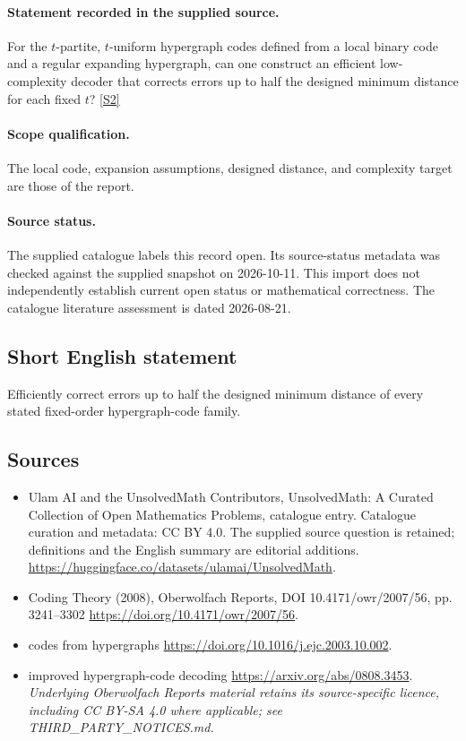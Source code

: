 \documentclass[11pt]{article}
\begin{document}
\paragraph{Statement recorded in the supplied source.}
For the $t$-partite, $t$-uniform hypergraph codes defined from a local binary code and a regular expanding hypergraph, can one construct an efficient low-complexity decoder that corrects errors up to half the designed minimum distance for each fixed $t$? \href{https://doi.org/10.4171/owr/2007/56}{[S2]}
\paragraph{Scope qualification.}
The local code, expansion assumptions, designed distance, and complexity target are those of the report.
\paragraph{Source status.}
The supplied catalogue labels this record open. Its source-status metadata was checked against the supplied snapshot on 2026-10-11. This import does not independently establish current open status or mathematical correctness. The catalogue literature assessment is dated 2026-08-21.
\subsection{Short English statement}
Efficiently correct errors up to half the designed minimum distance of every stated fixed-order hypergraph-code family.
\subsection{Sources}
\begin{itemize}
\item[S1] Ulam AI and the UnsolvedMath Contributors, UnsolvedMath: A Curated Collection of Open Mathematics Problems, catalogue entry. Catalogue curation and metadata: CC BY 4.0. The supplied source question is retained; definitions and the English summary are editorial additions.
\url{https://huggingface.co/datasets/ulamai/UnsolvedMath}.
\item[S2] Coding Theory (2008), Oberwolfach Reports, DOI 10.4171/owr/2007/56, pp. 3241--3302
\url{https://doi.org/10.4171/owr/2007/56}.
\item[S3] codes from hypergraphs
\url{https://doi.org/10.1016/j.ejc.2003.10.002}.
\item[S4] improved hypergraph-code decoding
\url{https://arxiv.org/abs/0808.3453}.
\textit{Underlying Oberwolfach Reports material retains its source-specific licence, including CC BY-SA 4.0 where applicable; see THIRD\_PARTY\_NOTICES.md.}
\end{itemize}
\end{document}
